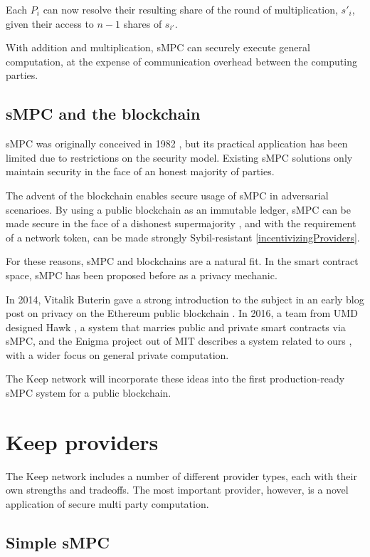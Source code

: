 \documentclass[11pt]{article}
\begin{document}
Each $P_i$ can now resolve their resulting share of the round of
multiplication, $s'_i$, given their access to $n-1$ shares of
$s_{i'}$.

With addition and multiplication, sMPC can securely execute general
computation, at the expense of communication overhead between the
computing parties.

\subsection{sMPC and the blockchain}

sMPC was originally conceived in 1982 \cite{yao1982protocols}, but its
practical application has been limited due to restrictions on the
security model. Existing sMPC solutions only maintain security in the
face of an honest majority of parties.

The advent of the blockchain enables secure usage of sMPC in
adversarial scenarioes. By using a public blockchain as an immutable
ledger, sMPC can be made secure in the face of a dishonest
supermajority \cite{spdz}, and with the requirement of a network
token, can be made strongly Sybil-resistant
\ref{incentivizingProviders}.

For these reasons, sMPC and blockchains are a natural fit. In the
smart contract space, sMPC has been proposed before as a privacy
mechanic.

In 2014, Vitalik Buterin gave a strong introduction to the subject in
an early blog post on privacy on the Ethereum public blockchain
\cite{secretSharingDaos}. In 2016, a team from UMD designed Hawk
\cite{hawk}, a system that marries public and private smart contracts
via sMPC, and the Enigma project out of MIT describes a system related
to ours \cite{enigma}, with a wider focus on general private
computation.

The Keep network will incorporate these ideas into the first
production-ready sMPC system for a public blockchain.

\section{Keep providers}

The Keep network includes a number of different provider types, each
with their own strengths and tradeoffs. The most important provider,
however, is a novel application of secure multi party computation.

\subsection{Simple sMPC}
\end{document}
